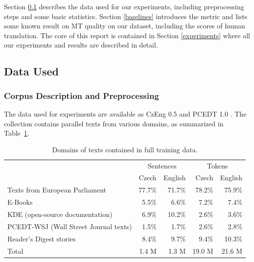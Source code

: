 \documentclass[10pt]{report}
\theoremstyle{plain}
\begin{document}
{{Section \ref{data} describes the data used for our experiments, including
preprocessing steps and some basic statistics. Section \ref{baselines}
introduces the metric and lists some known result on MT quality on our
dataset, including the scores of human translation. The core of this report is
contained in Section \ref{experiments} where all our experiments and results are
described in detail.




\subsection{Data Used}
\label{data}




\subsubsection{Corpus Description and Preprocessing}
\label{tools}


The data used for \bidir{} experiments are available as CzEng 0.5
 and PCEDT 1.0 . The collection contains parallel texts from various domains, as
summarized in Table~\ref{czengratios}.


\begin{table}[ht]
\begin{tabular}{lrr|rr}
  &  \multicolumn{2}{c}{Sentences}  &  \multicolumn{2}{c}{Tokens}\\
  &  Czech                             &  English                          &  Czech  &  English\\
\hline
Texts from European Parliament         &  77.7\%  &  71.7\%  &  78.2\%  &  75.9\%\\
E-Books                                &  5.5\%   &  6.6\%   &  7.2\%   &  7.4\%\\
KDE (open-source documentation)        &  6.9\%   &  10.2\%  &  2.6\%   &  3.6\%\\
PCEDT-WSJ (Wall Street Journal texts)  &  1.5\%   &  1.7\%   &  2.6\%   &  2.8\%\\
Reader's Digest stories                &  8.4\%   &  9.7\%   &  9.4\%   &  10.3\%\\
\hline
Total                                  &  1.4 M   &  1.3 M   &  19.0 M  &  21.6 M\\
\end{tabular}
\caption{Domains of texts contained in full training data.}
\label{czengratios}
\end{table}

}}
\end{document}

